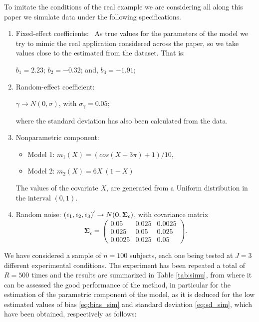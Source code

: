 \documentclass[sn-mathphys]{sn-jnl}%
\theoremstyle{thmstyleone}%
\theoremstyle{thmstyletwo}%
\theoremstyle{thmstylethree}%
\begin{document}
To imitate the conditions of the real example we are considering all along this paper we simulate data under the following specifications.
\begin{enumerate}
	\item Fixed-effect coefficients: \
	As true values for the parameters of the model we try to mimic the real application considered across the paper, so we take values close to the estimated from the dataset. That is:
	
	\begin{center}
		$b_1=2.23$;  $b_2= -0.32$; and, $b_3=-1.91$;
	\end{center}
	
	\item Random-effect coefficient:\ 
	\begin{center}
		$\gamma \rightarrow N (0, \sigma)$, with $\sigma_{\gamma}= 0.05$;
	\end{center}
	where the standard deviation has also been calculated from the data.
	\item Nonparametric component: 
	\begin{itemize}
		\item[] {Model 1}: $m_1(X) =  (cos(X+3\pi)+1)/10$, %
		\item[] {Model 2}: $m_2(X) = 6 X \ (1-X)$
	\end{itemize}
	The values of the covariate $X$, are generated from  a Uniform distribution in the interval $(0,1)$.
	\item Random noise: $\left(\epsilon_1,\epsilon_2,\epsilon_3\right)' \rightarrow N ({\bf 0}, {\mathbf \Sigma}_{\epsilon})$, with covariance matrix
	\[
	\mathbf{\Sigma}_{\epsilon}=\left(\begin{array}{ccc}
		0.05 & 0.025 & 0.0025 \\
		0.025 & 0.05 &0.025 \\
		0.0025& 0.025 & 0.05
	\end{array}
	\right).
	\]
	
	
\end{enumerate}
We have considered a sample of $n=100$ subjects, each one being tested at $J=3$ different experimental conditions. The experiment has been repeated a total of $R=500$ times and the results are summarized in Table \ref{tab:simu}, from where it can be assessed the good performance of the method, in particular for the estimation of the parametric component of the model, as it is deduced for the low estimated values of bias \eqref{eq:bias_sim} and standard deviation \eqref{eq:sd_sim}, which have been obtained, respectively as follows:
\end{document}
